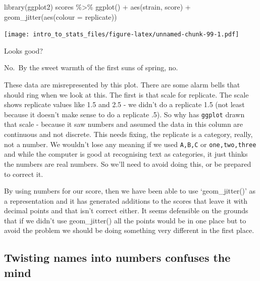 \documentclass[
]{book}
\newenvironment{Shaded}{\begin{snugshade}}{\end{snugshade}}
\newcommand{\AttributeTok}[1]{\textcolor[rgb]{0.77,0.63,0.00}{#1}}
\newcommand{\FunctionTok}[1]{\textcolor[rgb]{0.00,0.00,0.00}{#1}}
\newcommand{\NormalTok}[1]{#1}
\newcommand{\SpecialCharTok}[1]{\textcolor[rgb]{0.00,0.00,0.00}{#1}}
\newenvironment{sidenote}
{ \begin{tcolorbox}[colbacktitle=blue!50!white,
title=huh?,coltitle=white,
fonttitle=\bfseries] }
{  \end{tcolorbox} }
\begin{document}
\begin{Shaded}
\begin{Highlighting}[]
\FunctionTok{library}\NormalTok{(ggplot2)}
\NormalTok{scores }\SpecialCharTok{\%\textgreater{}\%} \FunctionTok{ggplot}\NormalTok{() }\SpecialCharTok{+} 
  \FunctionTok{aes}\NormalTok{(strain, score) }\SpecialCharTok{+} 
  \FunctionTok{geom\_jitter}\NormalTok{(}\FunctionTok{aes}\NormalTok{(}\AttributeTok{colour =}\NormalTok{ replicate))}
\end{Highlighting}
\end{Shaded}

\texttt{[image: intro\_to\_stats\_files/figure-latex/unnamed-chunk-99-1.pdf]}

Looks good?

No.~By the sweet warmth of the first suns of spring, no.

These data are misrepresented by this plot. There are some alarm bells that should ring when we look at this. The first is that scale for replicate. The scale shows replicate values like 1.5 and 2.5 - we didn't do a replicate 1.5 (not least because it doesn't make sense to do a replicate .5). So why has \texttt{ggplot} drawn that scale - because it saw numbers and assumed the data in this column are continuous and not discrete. This needs fixing, the replicate is a category, really, not a number. We wouldn't lose any meaning if we used \texttt{A,B,C} or \texttt{one,two,three} and while the computer is good at recognising text as categories, it just thinks the numbers are real numbers. So we'll need to avoid doing this, or be prepared to correct it.

\begin{sidenote}
By using numbers for our score, then we have been able to use `geom\_jitter()' as a representation and it has generated additions to the scores that leave it with decimal points and that isn't correct either. It seems defensible on the grounds that if we didn't use geom\_jitter() all the points would be in one place but to avoid the problem we should be doing something very different in the first place.
\end{sidenote}

\hypertarget{twisting-names-into-numbers-confuses-the-mind}{%
\subsection{Twisting names into numbers confuses the mind}\label{twisting-names-into-numbers-confuses-the-mind}}
\end{document}
